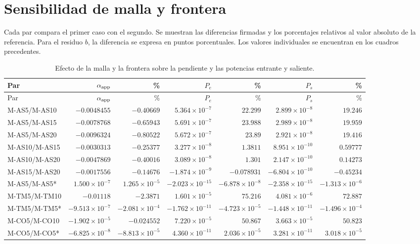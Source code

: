 \section{Sensibilidad de malla y frontera}
Cada par compara el primer caso con el segundo. Se muestran las diferencias firmadas y los porcentajes relativos al valor absoluto de la referencia. Para el residuo $b$, la diferencia se expresa en puntos porcentuales. Los valores individuales se encuentran en los cuadros precedentes.
\begingroup\footnotesize\setlength{\tabcolsep}{1.5pt}
\begin{longtable}{lrrrrrr}
\caption{Efecto de la malla y la frontera sobre la pendiente y las potencias entrante y saliente.}\label{t:sens0}\\
\hline Par & $\alpha_{\rm app}$ & \% & $P_e$ & \% & $P_s$ & \% \\ \hline\endfirsthead
\hline Par & $\alpha_{\rm app}$ & \% & $P_e$ & \% & $P_s$ & \% \\ \hline\endhead
M-AS5/M-AS10 & $-0.0048455$ & $-0.40669$ & $5.364\times 10^{-7}$ & $22.299$ & $2.899\times 10^{-8}$ & $19.246$ \\
M-AS5/M-AS15 & $-0.0078768$ & $-0.65943$ & $5.691\times 10^{-7}$ & $23.988$ & $2.989\times 10^{-8}$ & $19.959$ \\
M-AS5/M-AS20 & $-0.0096324$ & $-0.80522$ & $5.672\times 10^{-7}$ & $23.89$ & $2.921\times 10^{-8}$ & $19.416$ \\
M-AS10/M-AS15 & $-0.0030313$ & $-0.25377$ & $3.277\times 10^{-8}$ & $1.3811$ & $8.951\times 10^{-10}$ & $0.59777$ \\
M-AS10/M-AS20 & $-0.0047869$ & $-0.40016$ & $3.089\times 10^{-8}$ & $1.301$ & $2.147\times 10^{-10}$ & $0.14273$ \\
M-AS15/M-AS20 & $-0.0017556$ & $-0.14676$ & $-1.874\times 10^{-9}$ & $-0.078931$ & $-6.804\times 10^{-10}$ & $-0.45234$ \\
M-AS5/M-AS5* & $1.500\times 10^{-7}$ & $1.265\times 10^{-5}$ & $-2.023\times 10^{-15}$ & $-6.878\times 10^{-8}$ & $-2.358\times 10^{-15}$ & $-1.313\times 10^{-6}$ \\
M-TM5/M-TM10 & $-0.01118$ & $-2.3871$ & $1.601\times 10^{-5}$ & $75.216$ & $4.081\times 10^{-6}$ & $72.887$ \\
M-TM5/M-TM5* & $-9.513\times 10^{-7}$ & $-2.081\times 10^{-4}$ & $-1.762\times 10^{-11}$ & $-4.723\times 10^{-5}$ & $-1.448\times 10^{-11}$ & $-1.496\times 10^{-4}$ \\
M-CO5/M-CO10 & $-1.902\times 10^{-5}$ & $-0.024552$ & $7.220\times 10^{-5}$ & $50.867$ & $3.663\times 10^{-5}$ & $50.823$ \\
M-CO5/M-CO5* & $-6.825\times 10^{-8}$ & $-8.813\times 10^{-5}$ & $4.360\times 10^{-11}$ & $2.036\times 10^{-5}$ & $3.281\times 10^{-11}$ & $3.018\times 10^{-5}$ \\
\hline\end{longtable}\endgroup
